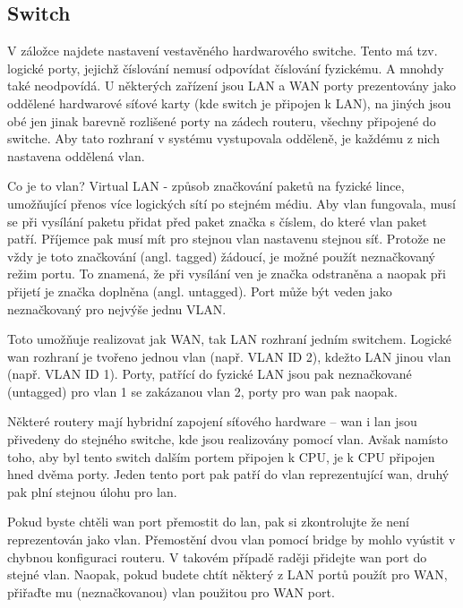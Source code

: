 \subsection{Switch}
\label{net:switch}
V záložce  najdete nastavení vestavěného
hardwarového switche. Tento má tzv. logické porty, jejichž číslování nemusí
odpovídat číslování fyzickému. A mnohdy také neodpovídá. U některých zařízení
jsou LAN a WAN porty prezentovány jako oddělené hardwarové síťové karty
(kde switch je připojen k LAN), na jiných jsou obé jen jinak barevně rozlišené
porty na zádech routeru, všechny připojené do switche. Aby tato rozhraní v
systému vystupovala odděleně, je každému z nich nastavena oddělená \gls{vlan}.


Co je to \gls{vlan}? Virtual LAN - způsob značkování
paketů na fyzické lince, umožňující přenos více logických sítí po stejném
médiu. Aby \gls{vlan} fungovala, musí se při vysílání paketu přidat před
paket značka s číslem, do které \gls{vlan} paket patří. Příjemce
pak musí mít pro stejnou \gls{vlan} nastavenu stejnou síť. Protože ne vždy
je toto značkování (angl. tagged) žádoucí, je možné použít neznačkovaný režim
portu. To znamená, že při vysílání ven je značka odstraněna a naopak při
přijetí je značka doplněna (angl. untagged). Port může být veden jako neznačkovaný
pro nejvýše jednu VLAN.

Toto umožňuje realizovat jak WAN, tak LAN rozhraní jedním switchem. Logické
\gls{wan} rozhraní je tvořeno jednou \gls{vlan} (např. VLAN ID 2), kdežto
LAN jinou \gls{vlan} (např. VLAN ID 1). Porty, patřící do fyzické LAN jsou
pak neznačkované (untagged) pro \gls{vlan} 1 se zakázanou \gls{vlan} 2, porty
pro \gls{wan} pak naopak.

Některé routery mají hybridní zapojení síťového hardware -- \gls{wan} i
\gls{lan} jsou přivedeny do stejného switche, kde jsou realizovány pomocí \gls{vlan}.
Avšak namísto toho, aby byl tento switch dalším portem připojen k CPU, je k CPU
připojen hned dvěma porty. Jeden tento port pak patří do \gls{vlan} reprezentující
\gls{wan}, druhý pak plní stejnou úlohu pro \gls{lan}.

Pokud byste chtěli \gls{wan} port přemostit do \gls{lan}, pak si zkontrolujte
že není reprezentován jako \gls{vlan}. Přemostění dvou vlan pomocí bridge
by mohlo vyústit v chybnou konfiguraci routeru. V takovém případě raději přidejte
\gls{wan} port do stejné \gls{vlan}. Naopak, pokud budete chtít některý z LAN
portů použít pro WAN, přiřaďte mu (neznačkovanou) \gls{vlan} použitou pro WAN
port.

